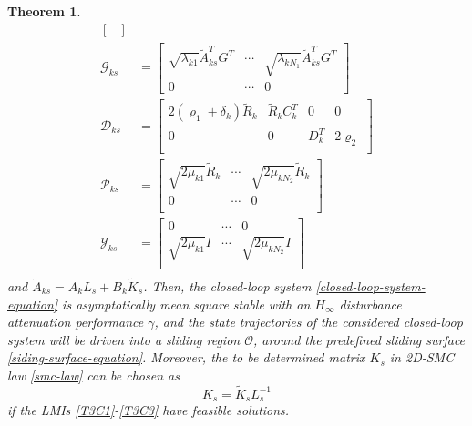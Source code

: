 \documentclass[conference]{IEEEtran}
\newtheorem{theorem}{Theorem}
\begin{document}
\begin{theorem}
\begin{equation}
\begin{split}
\begin{bmatrix}
			\end{bmatrix} \\
			\mathscr{G}_{ks} &=\begin{bmatrix}
				\sqrt{\lambda_{k1}} \tilde{A}^{T}_{ks}G^{T}& \cdots&\sqrt{\lambda_{kN_{1}}} \tilde{A}^{T}_{ks}G^{T}\\
				0  &\cdots& 0
			\end{bmatrix}\\
			\mathscr{D}_{ks} &= \begin{bmatrix}
				2(\varrho_{1}+ \delta_{k} )\tilde{R}_{k}& \tilde{R}_{k}C^{T}_{k}&0&0\\
				0&0&D^{T}_{k}&2\varrho_{2} \\
			\end{bmatrix} \\	
			\mathscr{P}_{ks} &= \begin{bmatrix}
				\sqrt{2\mu_{k1}} \tilde{R}_{k} &\cdots &\sqrt{2\mu_{kN_{2}}} \tilde{R}_{k}\\
				0 & \cdots & 0\\
			\end{bmatrix}	\\
			\mathscr{Y}_{ks} &= \begin{bmatrix}
				0 & \cdots & 0\\
				\sqrt{2\mu_{k1}} I &\cdots &\sqrt{2\mu_{kN_{2}}} I\\
			\end{bmatrix}	\\						
		\end{split}
	\end{equation}
	and $\tilde{A}_{ks} =  A_{k}L_{s} + B_{k}\tilde{K}_{s}$. Then,  the closed-loop system \eqref{closed-loop-system-equation} is asymptotically mean square stable with an $H_{\infty}$ disturbance attenuation performance $\gamma$, and the state trajectories of the considered closed-loop system will be driven into a sliding region $\mathcal{O}$, around the predefined sliding surface \eqref{siding-surface-equation}. Moreover, the to be determined matrix $K_{s}$ in 2D-SMC law \eqref{smc-law} can be chosen as 
	\begin{equation}
		K_{s} = \tilde{K}_{s}L^{-1}_{s}
	\end{equation}
	if the LMIs \eqref{T3C1}-\eqref{T3C3} have feasible solutions.
\end{theorem}
\end{document}
